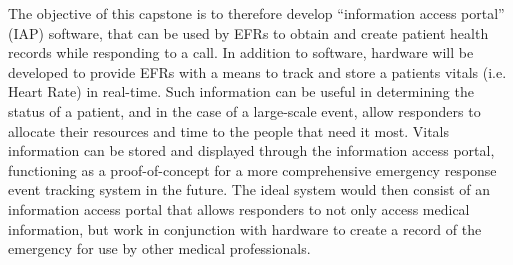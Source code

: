 \iffalse The objective of this Capstone Project is to therefore develop an information management system that stores health records for access by patients, and their healthcare providers. \fi The objective of this capstone is to therefore develop ``information access portal'' (IAP) software, that can be used by EFRs to obtain and create patient health records while responding to a call. In addition to software, hardware will be developed to provide EFRs with a means to track and store a patients vitals (i.e. Heart Rate) in real-time. Such information can be useful in determining the status of a patient, and in the case of a large-scale event, allow responders to allocate their resources and time to the people that need it most. Vitals information can be stored and displayed through the information access portal, functioning as a proof-of-concept for a more comprehensive emergency response event tracking system in the future. The ideal system would then consist of an information access portal that allows responders to not only access medical information, but work in conjunction with hardware to create a record of the emergency for use by other medical professionals.
